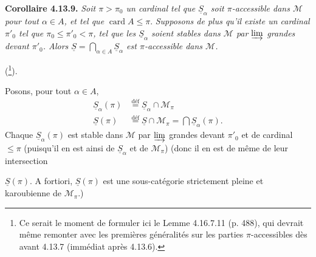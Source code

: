 \documentclass[11pt]{article}
\newcommand{\msp}[1]{\marginpar{\footnotesize [#1]}}
\newcommand{\M}{\mathcal{M}}
\newcommand{\card}{\operatorname{card}}
\newcommand{\uS}{\underline{S}}
\begin{document}
\textbf{Corollaire 4.13.9.} \textit{Soit $\pi > \pi_0$ un cardinal tel que $\uS_\alpha$ soit $\pi$-accessible dans $\M$ pour tout $\alpha \in A$, et tel que} $\card A \leqslant \pi$. \textit{Supposons de plus qu'il existe un cardinal $\pi'_0$ tel que $\pi_0 \leqslant \pi'_0 < \pi$, tel que les $\uS_\alpha$ soient stables dans $\M$ par $\varinjlim$ grandes devant $\pi'_0$. Alors $\uS = \bigcap_{\alpha\in A} \uS_\alpha$ est $\pi$-accessible dans $\M$.}

(\footnote[124]{Ce serait le moment de formuler ici le Lemme 4.16.7.11 (p. 488), qui devrait même remonter avec les premières généralités sur les parties $\pi$-accessibles dès avant 4.13.7 (immédiat après 4.13.6).}).

Posons, pour tout $\alpha \in A$,
\[
\begin{aligned}
\uS_\alpha(\pi) &\overset{\text{déf}}{=} \uS_\alpha \cap \M_\pi \\
\uS(\pi) &\overset{\text{déf}}{=} \uS \cap \M_\pi = \bigcap \uS_\alpha(\pi) .
\end{aligned}
\]
Chaque $\uS_\alpha(\pi)$ est stable dans $\M$ par $\varinjlim$ grandes devant $\pi'_0$ et de cardinal $\leqslant \pi$ (puisqu'il en est ainsi de $\uS_\alpha$ et de $\M_\pi$) (donc il en est de même de leur intersection

\msp{page 293}
$\uS(\pi)$. A fortiori, $\uS(\pi)$ est une sous-catégorie strictement pleine et karoubienne de $\M_\pi$.)
\end{document}

